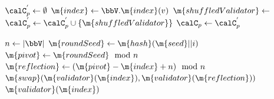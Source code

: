 \begin{algorithm}
\caption{Context Shuffling}\label{alg:shuffle}
\begin{algorithmic}[1]


    \State $\calC_{p}^{'} \gets \emptyset$
        \State $\m{index} \gets \bbV.\m{index}(v)$
        \State $\m{shuffledValidator} \gets\ $ 
        \State $\calC_{p}^{'} \gets  \calC_{p}^{'} \cup \{\m{shuffledValidator}\}$
    \EndFor 
    \State $\calC_{p} \gets \calC_{p}^{'}$
\EndProcedure
\item[] 

    \State $n \gets |\bbV|$
        \State $\m{roundSeed} \gets \m{hash}(\m{seed}||i)$
        \State $\m{pivot} \gets \m{roundSeed} \mod n$
        \State $\m{reflection} \gets (\m{pivot} -\m{index} + n)\mod n$
            \State $\m{swap}(\m{validator}(\m{index}), \m{validator}(\m{reflection}))$
        \EndIf
    \EndFor
    \State \Return $\m{validator}(\m{index})$
\EndProcedure




\end{algorithmic}
\end{algorithm}